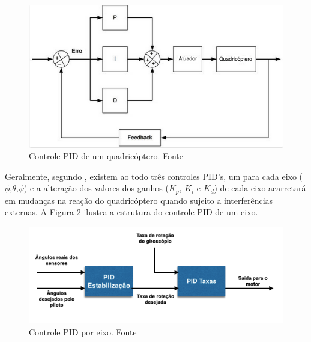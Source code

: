 \documentclass[a4paper, 12pt]{article}
\begin{document}
\begin{figure}[h]
	\centering
		\includegraphics[scale=0.5]{img/PID_quad_geral.png}
	\caption{Controle PID de um quadricóptero. Fonte \cite{Liang}}
	\label{fig:PIDquad}
\end{figure}


Geralmente, segundo \cite{Liang}, existem ao todo três controles PID's, um para cada eixo ($\phi$,$\theta$,$\psi$) e a alteração dos valores dos ganhos ($K_p$, $K_i$ e $K_d$) de cada eixo acarretará em mudanças na reação do quadricóptero quando sujeito a interferências externas. A Figura \ref{fig:PIDaxis} ilustra a estrutura do controle PID de um eixo.



\begin{figure}[h]
	\centering
		\includegraphics[scale=0.8]{img/PID_quad_axis.png}
	\caption{Controle PID por eixo. Fonte \cite{Liang}}
	\label{fig:PIDaxis}
\end{figure}
\end{document}
